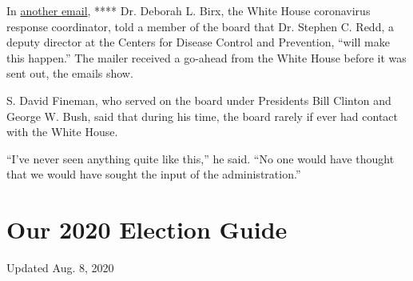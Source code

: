 In
\href{https://www.documentcloud.org/documents/7010863-USPS-Emails-Show-Trump-Coronavirus-Postcard-Was.html}{another
email}, **** Dr. Deborah L. Birx, the White House coronavirus response
coordinator, told a member of the board that Dr. Stephen C. Redd, a
deputy director at the Centers for Disease Control and Prevention,
``will make this happen.'' The mailer received a go-ahead from the White
House before it was sent out, the emails show.

S. David Fineman, who served on the board under Presidents Bill Clinton
and George W. Bush, said that during his time, the board rarely if ever
had contact with the White House.

``I've never seen anything quite like this,'' he said. ``No one would
have thought that we would have sought the input of the
administration.''

\hypertarget{our-2020-election-guide}{%
\section{Our 2020 Election Guide}\label{our-2020-election-guide}}

Updated Aug. 8, 2020

